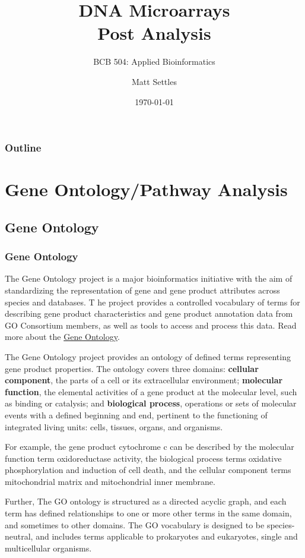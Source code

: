 \documentclass[pdf]{beamer}
\begin{document}
\title[Post Analysis]{DNA Microarrays\\Post Analysis\\}
\subtitle{BCB 504: Applied Bioinformatics\\}
\author[Matt Settles]{Matt Settles}
\date{\today}


\begin{frame}[plain]
  \titlepage
\end{frame}


\begin{frame}[plain] 
  \frametitle{Outline}
  \tableofcontents
\end{frame}

\section{Gene Ontology/Pathway Analysis}
\subsection{Gene Ontology}
\begin{frame}[allowframebreaks]
  \frametitle{Gene Ontology}
The Gene Ontology project is a major bioinformatics initiative with the aim of standardizing the representation of gene and gene product attributes across species and databases. T	he project provides a controlled vocabulary of terms for describing gene product characteristics and gene product annotation data from GO Consortium members, as well as tools to access and process this data. Read more about the \href{http://www.geneontology.org/}{Gene Ontology}.
\vspace{0.1in}

The Gene Ontology project provides an ontology of defined terms representing gene product properties. The ontology covers three domains: \textbf{cellular component}, the parts of a cell or its extracellular environment; \textbf{molecular function}, the elemental activities of a gene product at the molecular level, such as binding or catalysis; and \textbf{biological process}, operations or sets of molecular events with a defined beginning and end, pertinent to the functioning of integrated living units: cells, tissues, organs, and organisms.
\vspace{0.1in}

For example, the gene product cytochrome c can be described by the molecular function term oxidoreductase activity, the biological process terms oxidative phosphorylation and induction of cell death, and the cellular component terms mitochondrial matrix and mitochondrial inner membrane.
\vspace{0.1in}

Further, The GO ontology is structured as a directed acyclic graph, and each term has defined relationships to one or more other terms in the same domain, and sometimes to other domains. The GO vocabulary is designed to be species-neutral, and includes terms applicable to prokaryotes and eukaryotes, single and multicellular organisms.
\end{frame}
\end{document}
